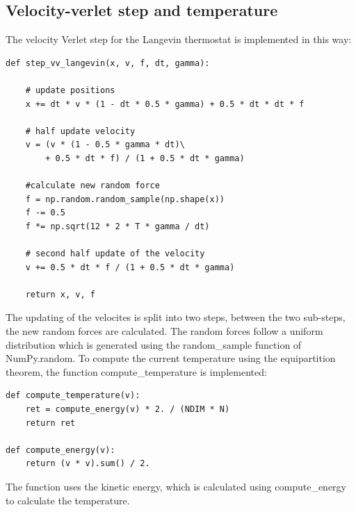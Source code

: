 \documentclass[a4paper,10pt,bibtotoc]{scrartcl}
\begin{document}
\subsection{Velocity-verlet step and temperature}
The velocity Verlet step for the Langevin thermostat is implemented in this way:
\begin{lstlisting}
def step_vv_langevin(x, v, f, dt, gamma):

    # update positions
    x += dt * v * (1 - dt * 0.5 * gamma) + 0.5 * dt * dt * f
    
    # half update velocity
    v = (v * (1 - 0.5 * gamma * dt)\
        + 0.5 * dt * f) / (1 + 0.5 * dt * gamma)
    
    #calculate new random force
    f = np.random.random_sample(np.shape(x))
    f -= 0.5
    f *= np.sqrt(12 * 2 * T * gamma / dt)

    # second half update of the velocity
    v += 0.5 * dt * f / (1 + 0.5 * dt * gamma)
    
    return x, v, f
\end{lstlisting}
The updating of the velocites is split into two steps, between the two sub-steps, the new random forces are calculated. 
The random forces follow a uniform distribution which is generated using the random\_sample function of NumPy.random.
To compute the current temperature using the equipartition theorem, the function compute\_temperature is implemented:
\begin{lstlisting}
def compute_temperature(v):
    ret = compute_energy(v) * 2. / (NDIM * N)
    return ret

def compute_energy(v):
    return (v * v).sum() / 2.
\end{lstlisting}
The function uses the kinetic energy, which is calculated using compute\_energy to calculate the temperature.
\end{document}
